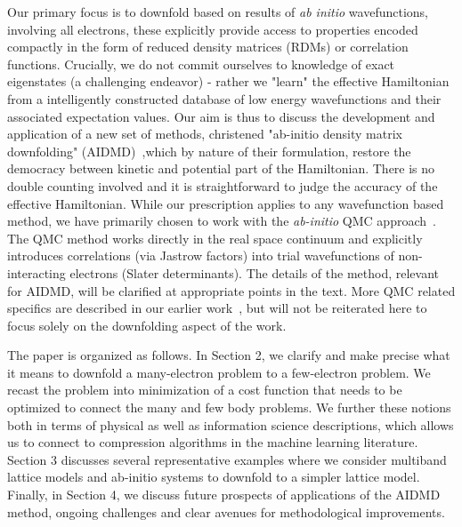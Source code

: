 Our primary focus is to downfold based on results of \textit{ab initio} wavefunctions, involving all electrons, these explicitly provide access to properties encoded compactly in the form of reduced density matrices (RDMs) or correlation functions. 
Crucially, we do not commit ourselves to knowledge of exact eigenstates (a challenging endeavor) - rather we "learn" the effective Hamiltonian from a intelligently constructed database of low energy wavefunctions and their associated expectation values. 
Our aim is thus to discuss the development and application of a new set of methods, christened "ab-initio density matrix downfolding" (AIDMD)~\cite{Changlani2015},which by nature of their formulation, restore the democracy between kinetic and potential part of the Hamiltonian. 
There is no double counting involved and it is straightforward to judge the accuracy of the effective Hamiltonian. 
While our prescription applies to any wavefunction based method, we have primarily chosen to work with the \textit{ab-initio} QMC approach~\cite{Ceperley_Alder,Foulkes_review}. 
The QMC method works directly in the real space continuum and explicitly introduces correlations (via Jastrow factors) into trial wavefunctions of non-interacting electrons (Slater determinants). 
The details of the method, relevant for AIDMD, will be clarified at appropriate points in the text. 
More QMC related specifics are described in our earlier work~\cite{Changlani2015,}, but will not be reiterated here to focus solely on the downfolding aspect of the work. 


The paper is organized as follows. In Section 2, we clarify and make precise what it means to downfold 
a many-electron problem to a few-electron problem. We recast the problem into minimization 
of a cost function that needs to be optimized to connect the many and few body problems. We further 
these notions both in terms of physical as well as information science descriptions, which allows us to connect to 
compression algorithms in the machine learning literature. 
Section 3 discusses several representative examples where we consider multiband lattice models 
and ab-initio systems to downfold to a simpler lattice model. 
Finally, in Section 4, we discuss future prospects of applications of the AIDMD method, ongoing challenges 
and clear avenues for methodological improvements. 


